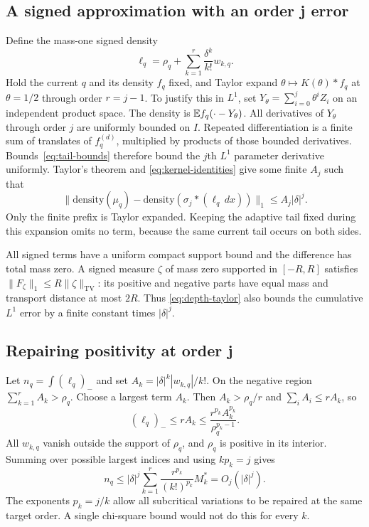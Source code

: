 \documentclass[11pt,letterpaper]{article}
\theoremstyle{remark}\newtheorem{remark}[theorem]{Remark}
\newcommand{\TV}{\operatorname{TV}}
\begin{document}
\subsection{A signed approximation with an order j error}
Define the mass-one signed density
\begin{equation}\label{eq:depth-signed}
\ell_q=\rho_q+\sum_{k=1}^r\frac{\delta^k}{k!}w_{k,q}.
\end{equation}
Hold the current $q$ and its density $f_q$ fixed, and Taylor expand
$\theta\mapsto K(\theta)*f_q$ at $\theta=1/2$ through order $r=j-1$.
To justify this in $L^1$, set $Y_\theta=\sum_{i=0}^j\theta^iZ_i$ on an independent product space. The density is $\mathbb E f_q(\cdot-Y_\theta)$. All derivatives of $Y_\theta$ through order $j$ are uniformly bounded on $I$. Repeated differentiation is a finite sum of translates of $f_q^{(d)}$, multiplied by products of those bounded derivatives. Bounds~\eqref{eq:tail-bounds} therefore bound the $j$th $L^1$ parameter derivative uniformly. Taylor's theorem and \eqref{eq:kernel-identities} give some finite $A_j$ such that
\begin{equation}\label{eq:depth-taylor}
\|\mathrm{density}(\mu_q)-\mathrm{density}(\sigma_j*(\ell_q\,dx))\|_1
\le A_j|\delta|^j.
\end{equation}
Only the finite prefix is Taylor expanded. Keeping the adaptive tail fixed during this expansion omits no term, because the same current tail occurs on both sides.

All signed terms have a uniform compact support bound and the difference has total mass zero. A signed measure $\zeta$ of mass zero supported in $[-R,R]$ satisfies
$\|F_\zeta\|_1\le R\|\zeta\|_{\TV}$: its positive and negative parts have equal mass and transport distance at most $2R$. Thus \eqref{eq:depth-taylor} also bounds the cumulative $L^1$ error by a finite constant times $|\delta|^j$.

\subsection{Repairing positivity at order j}
Let $n_q=\int(\ell_q)_-$ and set $A_k=|\delta|^k|w_{k,q}|/k!$. On the negative region $\sum_{k=1}^r A_k>\rho_q$. Choose a largest term $A_k$. Then $A_k>\rho_q/r$ and $\sum_iA_i\le rA_k$, so
\[
(\ell_q)_-\le rA_k\le
\frac{r^{p_k}A_k^{p_k}}{\rho_q^{p_k-1}}.
\]
All $w_{k,q}$ vanish outside the support of $\rho_q$, and $\rho_q$ is positive in its interior. Summing over possible largest indices and using $kp_k=j$ gives
\begin{equation}\label{eq:depth-negative}
n_q\le|\delta|^j\sum_{k=1}^r
\frac{r^{p_k}}{(k!)^{p_k}}M_k^*=O_j(|\delta|^j).
\end{equation}
The exponents $p_k=j/k$ allow all subcritical variations to be repaired at the same target order. A single chi-square bound would not do this for every $k$.
\end{document}
